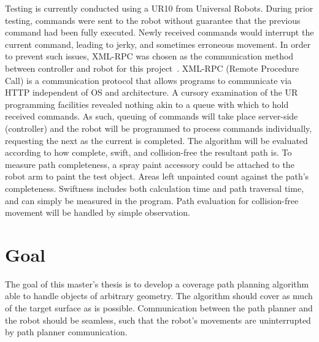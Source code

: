 \documentclass[a4paper, 10pt]{article}
\begin{document}
Testing is currently conducted using a UR10 from Universal Robots.
During prior testing, commands were sent to the robot without guarantee that the previous command had been fully executed.
Newly received commands would interrupt the current command, leading to jerky, and sometimes erroneous movement.
In order to prevent such issues, XML-RPC was chosen as the communication method between controller and robot for this project~\cite{UR_XML-RPC}.
XML-RPC (Remote Procedure Call) is a communication protocol that allows programs to communicate via HTTP independent of OS and architecture.
A cursory examination of the UR programming facilities revealed nothing akin to a queue with which to hold received commands.
As such, queuing of commands will take place server-side (controller) and the robot will be programmed to process commands individually, requesting the next as the current is completed.
The algorithm will be evaluated according to how complete, swift, and collision-free the resultant path is.
To measure path completeness, a spray paint accessory could be attached to the robot arm to paint the test object.
Areas left unpainted count against the path's completeness.
Swiftness includes both calculation time and path traversal time, and can simply be measured in the program.
Path evaluation for collision-free movement will be handled by simple observation.

\section*{Goal}
The goal of this master's thesis is to develop a coverage path planning algorithm able to handle objects of arbitrary geometry.
The algorithm should cover as much of the target surface as is possible.
Communication between the path planner and the robot should be seamless, such that the robot's movements are uninterrupted by path planner communication.
\end{document}
